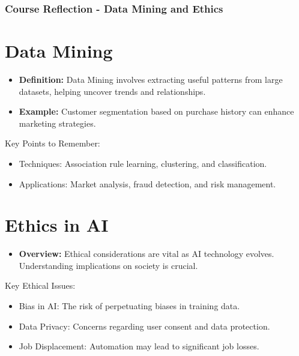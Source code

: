 \documentclass[aspectratio=169]{beamer}
\begin{document}
\begin{frame}[fragile]
    \frametitle{Course Reflection - Data Mining and Ethics}
    \section{Data Mining}
    \begin{itemize}
        \item \textbf{Definition:} Data Mining involves extracting useful patterns from large datasets, helping uncover trends and relationships.
        \item \textbf{Example:} Customer segmentation based on purchase history can enhance marketing strategies.
    \end{itemize}
    
    \begin{block}{Key Points to Remember:}
        \begin{itemize}
            \item Techniques: Association rule learning, clustering, and classification.
            \item Applications: Market analysis, fraud detection, and risk management.
        \end{itemize}
    \end{block}
    
    \section{Ethics in AI}
    \begin{itemize}
        \item \textbf{Overview:} Ethical considerations are vital as AI technology evolves. Understanding implications on society is crucial.
    \end{itemize}
    
    \begin{block}{Key Ethical Issues:}
        \begin{itemize}
            \item Bias in AI: The risk of perpetuating biases in training data.
            \item Data Privacy: Concerns regarding user consent and data protection.
            \item Job Displacement: Automation may lead to significant job losses.
        \end{itemize}
    \end{block}
\end{frame}
\end{document}
